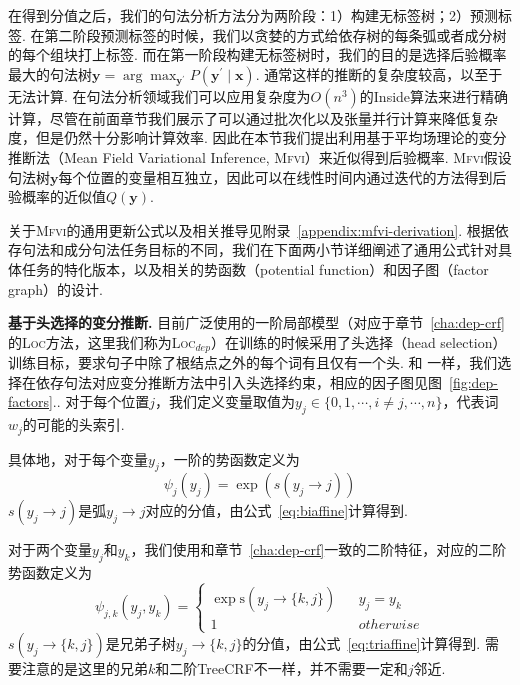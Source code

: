 在得到分值之后，我们的句法分析方法分为两阶段：1）构建无标签树；2）预测标签.
在第二阶段预测标签的时候，我们以贪婪的方式给依存树的每条弧或者成分树的每个组块打上标签.
而在第一阶段构建无标签树时，我们的目的是选择后验概率最大的句法树$\boldsymbol{y} = \arg\max_{\boldsymbol{y}^{\prime}} P(\boldsymbol{y}^{\prime}\mid \boldsymbol{x})$.
通常这样的推断的复杂度较高，以至于无法计算.
在句法分析领域我们可以应用复杂度为$O(n^3)$的Inside算法来进行精确计算，尽管在前面章节我们展示了可以通过批次化以及张量并行计算来降低复杂度，但是仍然十分影响计算效率.
因此在本节我们提出利用基于平均场理论的变分推断法（Mean Field Variational Inference, \textsc{Mfvi}）来近似得到后验概率.
\textsc{Mfvi}假设句法树$\boldsymbol{y}$每个位置的变量相互独立，因此可以在线性时间内通过迭代的方法得到后验概率的近似值$Q(\boldsymbol{y})$.

关于\textsc{Mfvi}的通用更新公式以及相关推导见附录~\ref{appendix:mfvi-derivation}.
根据依存句法和成分句法任务目标的不同，我们在下面两小节详细阐述了通用公式针对具体任务的特化版本，以及相关的势函数（potential function）和因子图（factor graph）的设计.

\noindent\textbf{基于头选择的变分推断.}
目前广泛使用的一阶局部模型（对应于章节~\ref{cha:dep-crf}的\textsc{Loc}方法，这里我们称为\textsc{Loc}$_{dep}$）在训练的时候采用了头选择（head selection）训练目标，要求句子中除了根结点之外的每个词有且仅有一个头.
和 \citep{wang-tu-2020-second}一样，我们选择在依存句法对应变分推断方法中引入头选择约束，相应的因子图见图~\ref{fig:dep-factors}..
对于每个位置$j$，我们定义变量取值为$y_j\in \{0,1,\cdots,i\neq j,\cdots,n\}$，代表词$w_j$的可能的头索引.

具体地，对于每个变量$y_j$，一阶的势函数定义为
\begin{equation}
  \label{eq:dep-1o-potential}
  \psi_j(y_j)=\exp(s(y_j\rightarrow j))
\end{equation}
$s(y_j\rightarrow j)$是弧$y_j\rightarrow j$对应的分值，由公式~\ref{eq:biaffine}计算得到.

对于两个变量$y_{j}$和$y_{k}$，我们使用和章节~\ref{cha:dep-crf}一致的二阶特征，对应的二阶势函数定义为
\begin{equation}
  \label{eq:2o-dep-potential}
  \psi_{j,k}(y_j,y_k)=\left\{
  \begin{array}{rcl}
    \exp \mathrm{s}(y_j\rightarrow \{k,j\}) &  & {y_j=y_k}   \\
    1                                       &  & {otherwise}
  \end{array}
  \right.
\end{equation}
$s(y_j\rightarrow \{k,j\})$是兄弟子树$y_j\rightarrow \{k,j\}$的分值，由公式~\ref{eq:triaffine}计算得到.
需要注意的是这里的兄弟$k$和二阶TreeCRF不一样，并不需要一定和$j$邻近.

